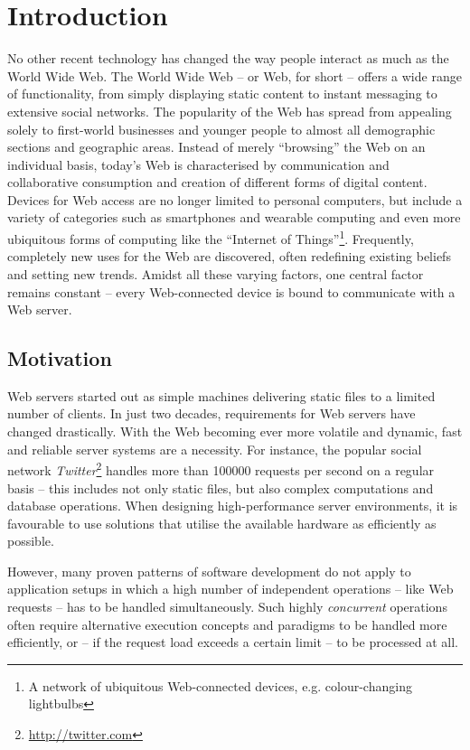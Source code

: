 \chapter{Introduction}
No other recent technology has changed the way people interact as much as the World Wide Web. The World Wide Web -- or Web, for short -- offers a wide range of functionality, from simply displaying static content to instant messaging to extensive social networks. The popularity of the Web has spread from appealing solely to first-world businesses and younger people to almost all demographic sections and geographic areas. Instead of merely ``browsing'' the Web on an individual basis, today's Web is characterised by communication and collaborative consumption and creation of different forms of digital content. Devices for Web access are no longer limited to personal computers, but include a variety of categories such as smartphones and wearable computing and even more ubiquitous forms of computing like the ``Internet of Things''\footnote{A network of ubiquitous Web-connected devices, e.g. colour-changing lightbulbs}. Frequently, completely new uses for the Web are discovered, often redefining existing beliefs and setting new trends. Amidst all these varying factors, one central factor remains constant -- every Web-connected device is bound to communicate with a Web server.

\section{Motivation}
Web servers started out as simple machines delivering static files to a limited number of clients. In just two decades, requirements for Web servers have changed drastically. With the Web becoming ever more volatile and dynamic, fast and reliable server systems are a necessity. For instance, the popular social network \textit{Twitter}\footnote{\url{http://twitter.com}} handles more than 100000 requests per second on a regular basis -- this includes not only static files, but also complex computations and database operations. When designing high-performance server environments, it is favourable to use solutions that utilise the available hardware as efficiently as possible.

However, many proven patterns of software development do not apply to application setups in which a high number of independent operations -- like Web requests -- has to be handled simultaneously. Such highly \textit{concurrent} operations often require alternative execution concepts and paradigms to be handled more efficiently, or -- if the request load exceeds a certain limit -- to be processed at all.

